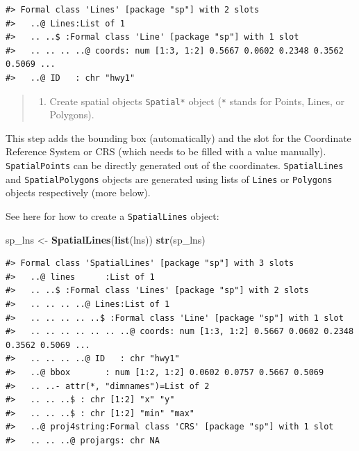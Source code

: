 \documentclass[]{book}
\newenvironment{Shaded}{\begin{snugshade}}{\end{snugshade}}
\newcommand{\KeywordTok}[1]{\textcolor[rgb]{0.13,0.29,0.53}{\textbf{#1}}}
\newcommand{\StringTok}[1]{\textcolor[rgb]{0.31,0.60,0.02}{#1}}
\newcommand{\NormalTok}[1]{#1}
\providecommand{\tightlist}{%
  \setlength{\itemsep}{0pt}\setlength{\parskip}{0pt}}
\theoremstyle{definition}
\theoremstyle{definition}
\theoremstyle{definition}
\theoremstyle{remark}
\begin{document}
\begin{verbatim}
#> Formal class 'Lines' [package "sp"] with 2 slots
#>   ..@ Lines:List of 1
#>   .. ..$ :Formal class 'Line' [package "sp"] with 1 slot
#>   .. .. .. ..@ coords: num [1:3, 1:2] 0.5667 0.0602 0.2348 0.3562 0.5069 ...
#>   ..@ ID   : chr "hwy1"
\end{verbatim}

\begin{quote}
\begin{enumerate}
\def\labelenumi{\Roman{enumi}.}
\setcounter{enumi}{1}
\tightlist
\item
  Create spatial objects \texttt{Spatial*} object (\texttt{*} stands for
  Points, Lines, or Polygons).
\end{enumerate}
\end{quote}

This step adds the bounding box (automatically) and the slot for the
Coordinate Reference System or CRS (which needs to be filled with a
value manually). \texttt{SpatialPoints} can be directly generated out of
the coordinates. \texttt{SpatialLines} and \texttt{SpatialPolygons}
objects are generated using lists of \texttt{Lines} or \texttt{Polygons}
objects respectively (more below).

See here for how to create a \texttt{SpatialLines} object:

\begin{Shaded}
\begin{Highlighting}[]
\NormalTok{sp_lns <-}\StringTok{ }\KeywordTok{SpatialLines}\NormalTok{(}\KeywordTok{list}\NormalTok{(lns))}
\KeywordTok{str}\NormalTok{(sp_lns)}
\end{Highlighting}
\end{Shaded}

\begin{verbatim}
#> Formal class 'SpatialLines' [package "sp"] with 3 slots
#>   ..@ lines      :List of 1
#>   .. ..$ :Formal class 'Lines' [package "sp"] with 2 slots
#>   .. .. .. ..@ Lines:List of 1
#>   .. .. .. .. ..$ :Formal class 'Line' [package "sp"] with 1 slot
#>   .. .. .. .. .. .. ..@ coords: num [1:3, 1:2] 0.5667 0.0602 0.2348 0.3562 0.5069 ...
#>   .. .. .. ..@ ID   : chr "hwy1"
#>   ..@ bbox       : num [1:2, 1:2] 0.0602 0.0757 0.5667 0.5069
#>   .. ..- attr(*, "dimnames")=List of 2
#>   .. .. ..$ : chr [1:2] "x" "y"
#>   .. .. ..$ : chr [1:2] "min" "max"
#>   ..@ proj4string:Formal class 'CRS' [package "sp"] with 1 slot
#>   .. .. ..@ projargs: chr NA
\end{verbatim}
\end{document}
